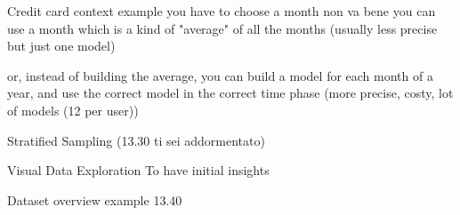             Credit card context example
                you have to choose a month 
                    non va bene
                    you can use a month which is a kind of "average" of all the months (usually less precise but just one model)

                    or, instead of building the average, you can build a model for each month of a year, and use the correct model in the correct time phase (more precise, costy, lot of models (12 per user))

        Stratified Sampling (13.30 ti sei addormentato)

        Visual Data Exploration 
            To have initial insights
            
        Dataset overview example 13.40